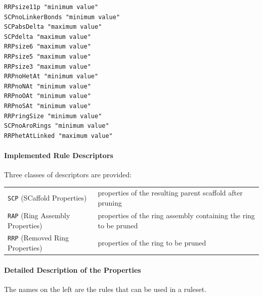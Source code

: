 \begin{verbatim}
RRPsize11p "minimum value"
SCPnoLinkerBonds "minimum value"	
SCPabsDelta "maximum value"	
SCPdelta "maximum value"
RRPsize6 "maximum value"	
RRPsize5 "maximum value"	
RRPsize3 "maximum value"	
RRPnoHetAt "minimum value"	
RRPnoNAt "minimum value"	
RRPnoOAt "minimum value"	
RRPnoSAt "minimum value"	
RRPringSize "minimum value"	
SCPnoAroRings "minimum value"	
RRPhetAtLinked "maximum value"
\end{verbatim}

\paragraph*{Implemented Rule Descriptors}
Three classes of descriptors are provided:

\begin{tabular}{lp{}}
\texttt{SCP} (SCaffold Properties)       & properties of the resulting parent scaffold after pruning \\
\texttt{RAP} (Ring Assembly Properties)  & properties of the ring assembly containing the ring to be pruned \\
\texttt{RRP} (Removed Ring Properties)   & properties of the ring to be pruned \\
\end{tabular}

\paragraph*{Detailed Description of the Properties}
The names on the left are the rules that can be used in a ruleset.

